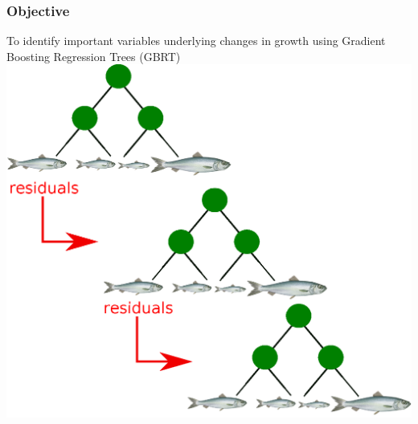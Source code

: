 \documentclass{beamer}
\begin{document}


\begin{frame}
\frametitle{Objective}
To identify important variables underlying changes in growth  using Gradient Boosting Regression Trees (GBRT)
\centering
\includegraphics[scale=0.47]{../fig/herring-tree}
\end{frame}
\end{document}
